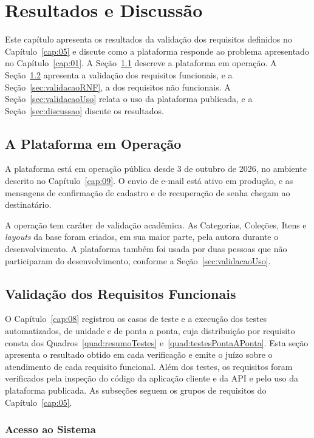 \chapter{Resultados e Discussão}
\label{cap:10}

Este capítulo apresenta os resultados da validação dos requisitos definidos no Capítulo~\ref{cap:05} e discute como a plataforma responde ao problema
apresentado no Capítulo~\ref{cap:01}. A Seção~\ref{sec:plataformaOperacao} descreve a plataforma em operação. A Seção~\ref{sec:validacaoRF} apresenta
a validação dos requisitos funcionais, e a Seção~\ref{sec:validacaoRNF}, a dos requisitos não funcionais. A Seção~\ref{sec:validacaoUso} relata o uso
da plataforma publicada, e a Seção~\ref{sec:discussao} discute os resultados.

\section{A Plataforma em Operação}
\label{sec:plataformaOperacao}

A plataforma está em operação pública desde 3 de outubro de 2026, no ambiente descrito no Capítulo~\ref{cap:09}. O envio de e-mail está ativo em produção,
e as mensagens de confirmação de cadastro e de recuperação de senha chegam ao destinatário.

A operação tem caráter de validação acadêmica. As Categorias, Coleções, Itens e \textit{layouts} da base foram criados, em sua maior parte, pela autora
durante o desenvolvimento. A plataforma também foi usada por duas pessoas que não participaram do desenvolvimento, conforme a Seção~\ref{sec:validacaoUso}.

\section{Validação dos Requisitos Funcionais}
\label{sec:validacaoRF}

O Capítulo~\ref{cap:08} registrou os casos de teste e a execução dos testes automatizados, de unidade e de ponta a ponta, cuja distribuição por requisito
consta dos Quadros~\ref{quad:resumoTestes} e~\ref{quad:testesPontaAPonta}. Esta seção apresenta o resultado obtido em cada verificação e emite o juízo sobre o atendimento de cada requisito funcional.
Além dos testes, os requisitos foram verificados pela inspeção do código da aplicação cliente e da API e pelo uso da plataforma publicada.
As subseções seguem os grupos de requisitos do Capítulo~\ref{cap:05}.

\subsection{Acesso ao Sistema}

